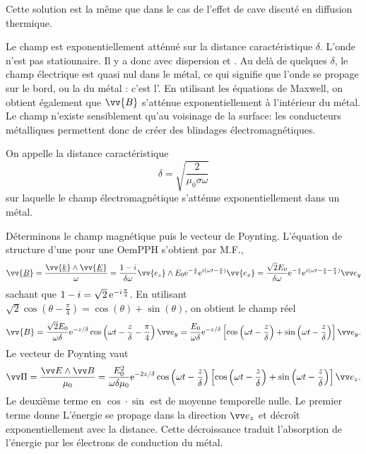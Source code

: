 \documentclass[12pt,fancy]{cours}
\begin{document}
  \begin{remarque}
 Cette solution est la même que dans le cas de l'effet de cave discuté en diffusion thermique.
  \end{remarque}

  Le champ est exponentiellement atténué sur la distance caractéristique $\delta$. L'onde n'est pas stationnaire. Il y a donc  avec dispersion et . Au delà de quelques $\delta$, le champ électrique est quasi nul dans le métal, ce qui signifie que l’onde se propage sur le bord, ou la  du métal  : c'est l'. En utilisant les équations de Maxwell, on obtient également que $\vv{B}$ s'atténue exponentiellement à l'intérieur du métal. Le champ n'existe sensiblement qu'au voisinage de la surface: les conducteurs métalliques permettent donc de créer des blindages électromagnétiques.

  \begin{definition}\label{def:}
    On appelle  la distance caractéristique
    $$
   \delta = \sqrt{\frac{2}{\mu_0\sigma\omega}}
    $$
    sur laquelle le champ électromagnétique s’atténue exponentiellement dans un métal.
  \end{definition}


Déterminons le champ magnétique puis le vecteur de Poynting. L'équation de structure d’une pour une OemPPH s’obtient par M.F., 
\begin{equation}
  \vv{\underline{B}}=\frac{\vv{\underline{k}}\pv\vv{\underline{E}}}{\omega}=\frac{1-i}{\delta \omega}\vv{e_z}\pv E_0\e^{-\frac{z}{\delta}}\e^{i(\omega t-\frac{z}{\delta})}\vv{e_x}=\frac{\sqrt{2}E_0}{\delta \omega}\e^{-\frac{z}{\delta}}\e^{i(\omega t-\frac{z}{\delta}-\frac{\pi}{4})}\ey
  \end{equation}
sachant que $1-i=\sqrt{2}\,\mathrm{e}^{-i\frac{\pi}{4}}$. En utilisant $\sqrt{2}\cos(\theta-\frac{\pi}{4})=\cos(\theta)+\sin(\theta)$, on obtient le champ réel
\begin{equation}
   \vv{B}=\frac{\sqrt{2}E_0}{\omega\delta}\e^{-z /\delta}\cos\left(\omega t-\frac{z}{\delta} -\frac{\pi}{4}\right) \ey = \frac{E_0}{\omega\delta}\e^{-z /\delta}\left[\cos\left(\omega t-\frac{z}{\delta}\right)+\sin\left(\omega t-\frac{z}{\delta}\right)\right]\ey.
   \end{equation}
   Le vecteur de Poynting vaut
   \begin{equation}
     \Poy = \frac{\E\pv\B}{\mu_0} = \frac{E_0^2}{\omega\delta\mu_0} \e^{-2z /\delta} \cos\left(\omega t-\frac{z}{\delta}\right)\left[\cos\left(\omega t-\frac{z}{\delta}\right)+\sin\left(\omega t-\frac{z}{\delta}\right)\right]\ez.
   \end{equation}
   Le deuxième terme en $\cos \cdot \sin$ est de moyenne temporelle nulle. Le premier terme donne
  L'énergie se propage dans la direction $\ez$ et décroît exponentiellement avec la distance. Cette décroissance traduit l'absorption de l'énergie par les électrons de conduction du métal.
\end{document}
